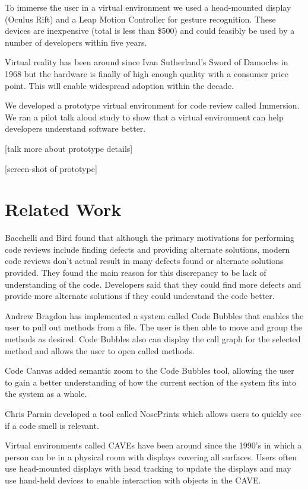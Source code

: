 \documentclass{acm_proc_article-sp}
\begin{document}
To immerse the user in a virtual environment we used a head-mounted display (Oculus Rift) and a Leap Motion Controller for gesture recognition. These devices are inexpensive (total is less than \$500) and could feasibly be used by a number of developers within five years.

Virtual reality has been around since Ivan Sutherland's Sword of Damocles in 1968 but the hardware is finally of high enough quality with a consumer price point. This will enable widespread adoption within the decade.

We developed a prototype virtual environment for code review called Immersion. We ran a pilot talk aloud study to show that a virtual environment can help developers understand software better. 

[talk more about prototype details]

[screen-shot of prototype]

\section{Related Work}
Bacchelli and Bird found that although the primary motivations for performing code reviews include finding defects and providing alternate solutions, modern code reviews don't actual result in many defects found or alternate solutions provided.  They found the main reason for this discrepancy to be lack of understanding of the code.  Developers said that they could find more defects and provide more alternate solutions if they could understand the code better.
 
Andrew Bragdon has implemented a system called Code Bubbles that enables the user to pull out methods from a file. The user is then able to move and group the methods as desired.  Code Bubbles also can display the call graph for the selected method and allows the user to open called methods.

Code Canvas added semantic zoom to the Code Bubbles tool, allowing the user to gain a better understanding of how the current section of the system fits into the system as a whole.

Chris Parnin developed a tool called NosePrints which allows users to quickly see if a code smell is relevant.

Virtual environments called CAVEs have been around since the 1990's in which a person can be in a physical room with displays covering all surfaces.  Users often use head-mounted displays with head tracking to update the displays and may use hand-held devices to enable interaction with objects in the CAVE.
\end{document}
